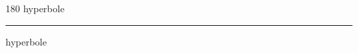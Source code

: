 
\begin{frame}
\begin{center}
\begin{turn}{180}
{\fontsize{2.5cm}{1em}\selectfont hyperbole}
\end{turn}
\vspace{1em}\par  
\hrule
\vspace{1em}\par  
{\fontsize{2.5cm}{1em}\selectfont hyperbole}
\end{center}
\end{frame}
